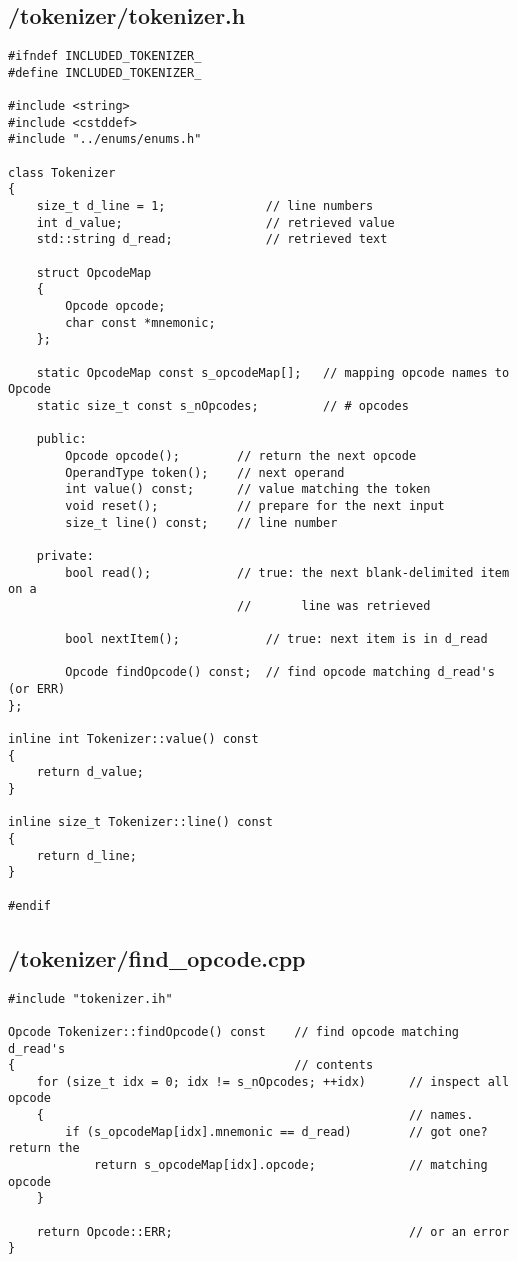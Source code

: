 \documentclass{article}
\begin{document}
\subsection*{/tokenizer/tokenizer.h}
\begin{verbatim}
#ifndef INCLUDED_TOKENIZER_
#define INCLUDED_TOKENIZER_

#include <string>
#include <cstddef>
#include "../enums/enums.h"

class Tokenizer
{
    size_t d_line = 1;              // line numbers
    int d_value;                    // retrieved value
    std::string d_read;             // retrieved text

    struct OpcodeMap
    {
        Opcode opcode;
        char const *mnemonic;
    };

    static OpcodeMap const s_opcodeMap[];   // mapping opcode names to Opcode
    static size_t const s_nOpcodes;         // # opcodes

    public:
        Opcode opcode();        // return the next opcode
        OperandType token();    // next operand
        int value() const;      // value matching the token
        void reset();           // prepare for the next input
        size_t line() const;    // line number

    private:
        bool read();            // true: the next blank-delimited item on a
                                //       line was retrieved

        bool nextItem();            // true: next item is in d_read

        Opcode findOpcode() const;  // find opcode matching d_read's (or ERR)
};

inline int Tokenizer::value() const         
{
    return d_value;
}

inline size_t Tokenizer::line() const
{
    return d_line;
}

#endif
\end{verbatim}
\subsection*{/tokenizer/find\_opcode.cpp}
\begin{verbatim}
#include "tokenizer.ih"

Opcode Tokenizer::findOpcode() const    // find opcode matching d_read's 
{                                       // contents
    for (size_t idx = 0; idx != s_nOpcodes; ++idx)      // inspect all opcode
    {                                                   // names.
        if (s_opcodeMap[idx].mnemonic == d_read)        // got one? return the
            return s_opcodeMap[idx].opcode;             // matching opcode
    }

    return Opcode::ERR;                                 // or an error
}
\end{verbatim}
\end{document}
